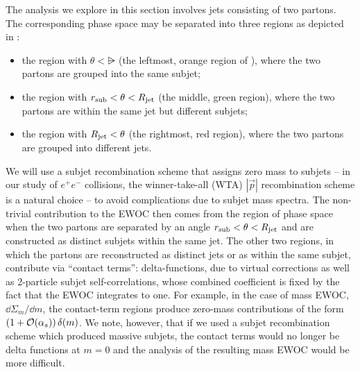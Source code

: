 The analysis we explore in this section involves jets consisting of two partons.
%
The corresponding phase space may be separated into three regions as depicted in :
\begin{itemize}
    \item
    the region with \(\theta < \rsub\) (the leftmost, orange region of ), where the two partons are grouped into the same subjet;

    \item
    the region with \(r_\text{sub} < \theta < R_\text{jet}\) (the middle, green region), where the two partons are within the same jet but different subjets;

    \item
    the region with \(R_\text{jet} < \theta\) (the rightmost, red region), where the two partons are grouped into different jets.
\end{itemize}
%
We will use a subjet recombination scheme that assigns zero mass to subjets -- in our study of \(e^+ e^-\) collisions, the winner-take-all (WTA) \(|\vec{p}|\) recombination scheme is a natural choice -- to avoid complications due to subjet mass spectra.
%
The non-trivial contribution to the EWOC then comes from the region of phase space when the two partons are separated by an angle \(r_\text{sub} < \theta < R_\text{jet}\) and are constructed as distinct subjets within the same jet.
%
The other two regions, in which the partons are reconstructed as distinct jets or as within the same subjet, contribute via ``contact terms'':
%
delta-functions, due to virtual corrections as well as 2-particle subjet self-correlations, whose combined coefficient is fixed by the fact that the EWOC integrates to one.
%
For example, in the case of mass EWOC, $\dd \Sigma_m / \dd m$, the contact-term regions produce zero-mass contributions of the form \(\left(1 + \mathcal{O}(\alpha_s)\right)\delta(m)\).
%
We note, however, that if we used a subjet recombination scheme which produced massive subjets, the contact terms would no longer be delta functions at \(m = 0\) and the analysis of the resulting mass EWOC would be more difficult.

